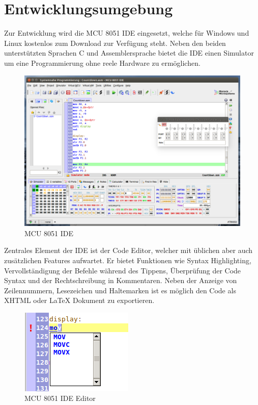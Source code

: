 
\chapter{Entwicklungsumgebung}\label{entwicklungsumgebung}

Zur Entwicklung wird die MCU 8051 \ac{IDE} eingesetzt, welche für
Windows und Linux kostenlos zum Download zur Verfügung steht. Neben den
beiden unterstützten Sprachen C und Assemblersprache bietet die \ac{IDE}
einen Simulator um eine Programmierung ohne reele Hardware zu
ermöglichen.

\begin{figure}[htbp]
\centering
\includegraphics{images/ide.png}
\caption{MCU 8051 IDE}
\end{figure}

Zentrales Element der \ac{IDE} ist der Code Editor, welcher mit üblichen
aber auch zusätzlichen Features aufwartet. Er bietet Funktionen wie
Syntax Highlighting, Vervollständigung der Befehle während des Tippens,
Überprüfung der Code Syntax und der Rechtschreibung in Kommentaren.
Neben der Anzeige von Zeilennummern, Lesezeichen und Haltemarken ist es
möglich den Code als XHTML oder LaTeX Dokument zu exportieren.

\begin{figure}[htbp]
\centering
\includegraphics{images/editor.png}
\caption{MCU 8051 IDE Editor}
\end{figure}

